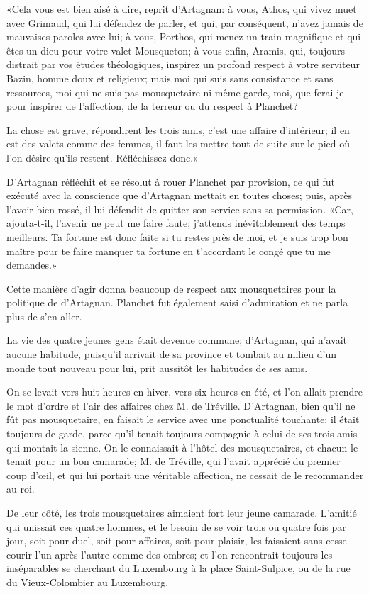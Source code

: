 «Cela vous est bien aisé à dire, reprit d'Artagnan: à vous, Athos, qui vivez muet avec Grimaud, qui lui défendez de parler, et qui, par conséquent, n'avez jamais de mauvaises paroles avec lui; à vous, Porthos, qui menez un train magnifique et qui êtes un dieu pour votre valet Mousqueton; à vous enfin, Aramis, qui, toujours distrait par vos études théologiques, inspirez un profond respect à votre serviteur Bazin, homme doux et religieux; mais moi qui suis sans consistance et sans ressources, moi qui ne suis pas mousquetaire ni même garde, moi, que ferai-je pour inspirer de l'affection, de la terreur ou du respect à Planchet? 

\speak  La chose est grave, répondirent les trois amis, c'est une affaire d'intérieur; il en est des valets comme des femmes, il faut les mettre tout de suite sur le pied où l'on désire qu'ils restent. Réfléchissez donc.» 

D'Artagnan réfléchit et se résolut à rouer Planchet par provision, ce qui fut exécuté avec la conscience que d'Artagnan mettait en toutes choses; puis, après l'avoir bien rossé, il lui défendit de quitter son service sans sa permission. «Car, ajouta-t-il, l'avenir ne peut me faire faute; j'attends inévitablement des temps meilleurs. Ta fortune est donc faite si tu restes près de moi, et je suis trop bon maître pour te faire manquer ta fortune en t'accordant le congé que tu me demandes.» 

Cette manière d'agir donna beaucoup de respect aux mousquetaires pour la politique de d'Artagnan. Planchet fut également saisi d'admiration et ne parla plus de s'en aller. 

La vie des quatre jeunes gens était devenue commune; d'Artagnan, qui n'avait aucune habitude, puisqu'il arrivait de sa province et tombait au milieu d'un monde tout nouveau pour lui, prit aussitôt les habitudes de ses amis. 

On se levait vers huit heures en hiver, vers six heures en été, et l'on allait prendre le mot d'ordre et l'air des affaires chez M. de Tréville. D'Artagnan, bien qu'il ne fût pas mousquetaire, en faisait le service avec une ponctualité touchante: il était toujours de garde, parce qu'il tenait toujours compagnie à celui de ses trois amis qui montait la sienne. On le connaissait à l'hôtel des mousquetaires, et chacun le tenait pour un bon camarade; M. de Tréville, qui l'avait apprécié du premier coup d'œil, et qui lui portait une véritable affection, ne cessait de le recommander au roi. 

De leur côté, les trois mousquetaires aimaient fort leur jeune camarade. L'amitié qui unissait ces quatre hommes, et le besoin de se voir trois ou quatre fois par jour, soit pour duel, soit pour affaires, soit pour plaisir, les faisaient sans cesse courir l'un après l'autre comme des ombres; et l'on rencontrait toujours les inséparables se cherchant du Luxembourg à la place Saint-Sulpice, ou de la rue du Vieux-Colombier au Luxembourg. 

